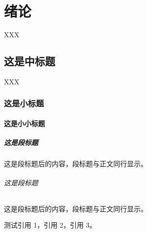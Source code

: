 
\chapter{绪论}
XXX
\section{这是中标题}
XXX
\subsection{这是小标题}
\subsubsection{这是小小标题}
\paragraph{这是段标题}
这是段标题后的内容，段标题与正文同行显示。
\subparagraph{这是段标题}
这是段标题后的内容，段标题与正文同行显示。

测试引用 1\cite{周融2003}，引用 2\cite{伍蠡甫,图书馆,张筑生}，引用 3\cite{gbt7714_2006,冯西桥1998,姜锡洲,中国大学学报论文文摘,DUBAR2013--,FOURNEY}。

